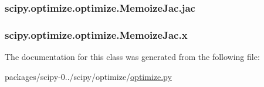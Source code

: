 \subsubsection[{jac}]{\setlength{\rightskip}{0pt plus 5cm}scipy.\+optimize.\+optimize.\+Memoize\+Jac.\+jac}\label{classscipy_1_1optimize_1_1optimize_1_1MemoizeJac_aa4fa5285b93c838842873a8166a945ae}
\hypertarget{classscipy_1_1optimize_1_1optimize_1_1MemoizeJac_a87c3c412579e897c04361c078dafc142}{}
\subsubsection[{x}]{\setlength{\rightskip}{0pt plus 5cm}scipy.\+optimize.\+optimize.\+Memoize\+Jac.\+x}\label{classscipy_1_1optimize_1_1optimize_1_1MemoizeJac_a87c3c412579e897c04361c078dafc142}


The documentation for this class was generated from the following file\+:\begin{DoxyCompactItemize}
\item 
packages/scipy-\/0../scipy/optimize/\hyperlink{optimize_8py}{optimize.\+py}\end{DoxyCompactItemize}
